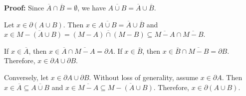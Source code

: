 \textbf{Proof:} Since $\overline{A} \cap \overline{B} = \emptyset$, we have $\overline{A \cup B} = \overline{A} \cup \overline{B}$.

Let $x \in \partial(A \cup B)$. Then $x \in \overline{A \cup B} = \overline{A} \cup \overline{B}$ and $x \in \overline{M - (A \cup B)} = \overline{(M - A) \cap (M - B)} \subseteq \overline{M - A} \cap \overline{M - B}$.

If $x \in \overline{A}$, then $x \in \overline{A} \cap \overline{M - A} = \partial A$. If $x \in \overline{B}$, then $x \in \overline{B} \cap \overline{M - B} = \partial B$. Therefore, $x \in \partial A \cup \partial B$.

Conversely, let $x \in \partial A \cup \partial B$. Without loss of generality, assume $x \in \partial A$. Then $x \in \overline{A} \subseteq \overline{A \cup B}$ and $x \in \overline{M - A} \subseteq \overline{M - (A \cup B)}$. Therefore, $x \in \partial(A \cup B)$.

